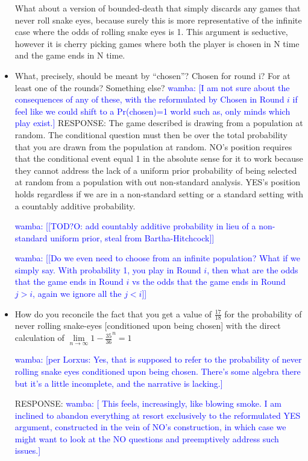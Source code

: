 \documentclass[article,twocolumn]{memoir}
\newcommand{\wamba} [1]{\ifnum\Chatty=1 \textcolor{blue}{wamba:  [#1]} \fi}
\begin{document}
\begin{itemize}
{        What about a version of bounded-death that simply discards any games that never roll snake eyes, because surely this is more representative of the infinite case where the odds of rolling snake eyes is 1.  This argument is seductive, however it is cherry picking games where both the player is chosen in N time and the game ends in N time.  
    }
\item What, precisely, should be meant by “chosen”? Chosen for round i? For at least one of the rounds? Something else?
    \wamba{I am not sure about the consequences of any of these,  with the reformulated by Chosen in Round $i$ if feel like we could shift to a Pr(chosen)=1 world such as, only minds which play exist.}
    {\color{violet}
        RESPONSE: 
        The game described is drawing from a population at random. The conditional question must then be over the total probability that you are drawn from the population at random. NO's position requires that the conditional event equal 1 in the absolute sense for it to work because they cannot address the lack of a uniform prior probability of being selected at random from a population with out non-standard analysis.  YES's position holds regardless if we are in a non-standard setting or a standard setting with a countably additive probability.
    }
    
        \wamba{[TOD?O: add countably additive probability in lieu of a non-standard uniform prior, steal from Bartha-Hitchcock]}
        
        \wamba{[Do we even need to choose from an infinite population?  What if we simply say. With probability 1, you play in Round $i$, then what are the odds that the game ends in Round $i$ vs the odds that the game ends in Round $j>i$, again we ignore all the $j<i$]}
\item How do you reconcile the fact that you get a value of $\frac{17}{18}$ for the probability of never rolling snake-eyes [conditioned upon being chosen] with the direct calculation of $\underset{n\to\infty}{\lim}1-\frac{35}{36}^n=1$

\wamba{per Lorxus: Yes, that is supposed to refer to the  probability of never rolling snake eyes conditioned upon being chosen. There's some algebra there but it's a little incomplete, and the narrative is lacking.}
    
    {\color{violet}
        RESPONSE: 
        \wamba{ This feels, increasingly, like blowing smoke. I am inclined to abandon everything at resort exclusively to the reformulated YES argument, constructed in the vein of NO's construction, in which case we might want to look at the NO questions and preemptively address such issues.}

}
\end{itemize}
\end{document}
